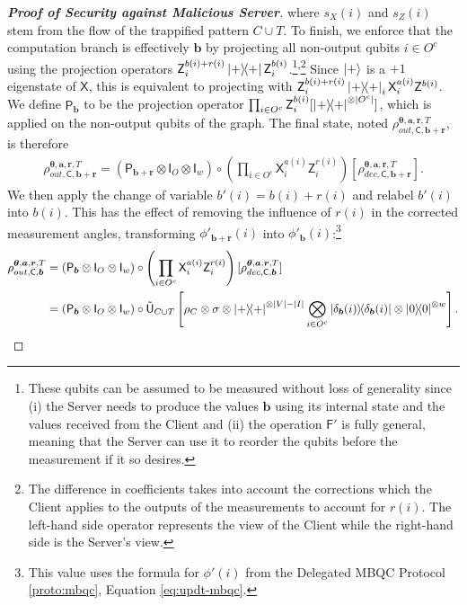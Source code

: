 \documentclass[12pt]{iopart}
\newcommand{\cptp}[1]{\mathsf{#1}} \newcommand{\pd}[1]{\mathcal{#1}}  \newcommand{\sch}[1]{\bm{#1}}
\newcommand{\Id}{\cptp{I}}
\newcommand{\X}{\cptp{X}}
\newcommand{\Z}{\cptp{Z}}
\renewcommand{\1}{\mathds{1}}
\newcommand{\TP}{C\cup T}
\begin{document}
\begin{proof}[\bf Proof of Security against Malicious Server]
where $s_X(i)$ and $s_Z(i)$ stem from the flow of the trappified pattern $\TP$. To finish, we enforce that the computation branch is effectively $\bm{b}$ by projecting all non-output qubits $i \in O^c$ using the projection operators $\Z_i^{b(i) + r(i)}\dyad{+}\Z_i^{b(i)}$.\footnote{These qubits can be assumed to be measured without loss of generality since (i) the Server needs to produce the values $\bm{b}$ using its internal state and the values received from the Client and (ii) the operation $\cptp F'$ is fully general, meaning that the Server can use it to reorder the qubits before the measurement if it so desires.}\textsuperscript{,}\footnote{The difference in coefficients takes into account the corrections which the Client applies to the outputs of the measurements to account for $r(i)$. The left-hand side operator represents the view of the Client while the right-hand side is the Server's view.} Since $\ket{+}$ is a $+1$ eigenstate of $\X$, this is equivalent to projecting with $\Z_i^{b(i) + r(i)}\dyad{+}_i\X_i^{a(i)}\Z^{b(i)}$. We define $\cptp P_{\bm{b}}$ to be the projection operator $\prod_{i \in O^c}\Z^{b(i)}_i[\dyad{+}^{\otimes \abs{O^c}}]$, which is applied on the non-output qubits of the graph. The final state, noted $\rho_{out, \cptp C, \bm{b} + \bm{r}}^{\bm{\theta},\bm{a}, \bm{r}, T}$, is therefore
\begin{align}
\rho_{out, \cptp C, \bm{b} + \bm{r}}^{\bm{\theta},\bm{a}, \bm{r}, T} = (\cptp P_{\bm{b} + \bm{r}}\otimes \Id_O\otimes \Id_w) \circ \left(\prod_{i \in O^c} \X^{a(i)}_i\Z^{r(i)}_i\right)[\rho_{dec, \cptp C, \bm{b} + \bm{r}}^{\bm{\theta},\bm{a}, \bm{r}, T}].
\end{align}
We then apply the change of variable $b'(i) = b(i) + r(i)$ and relabel $b'(i)$ into $b(i)$. This has the effect of removing the influence of $r(i)$ in the corrected measurement angles, transforming $\phi'_{\bm{b} +\bm{r}}(i)$ into $\phi'_{\bm{b}}(i)$:\footnote{This value uses the formula for $\phi'(i)$ from the Delegated MBQC Protocol \ref{proto:mbqc}, Equation \ref{eq:updt-mbqc}.}
\begin{align}
\rho_{out, \cptp C, \bm{b}}^{\bm{\theta},\bm{a}, \bm{r}, T} &= (\cptp P_{\bm{b}}\otimes \Id_O\otimes\Id_w) \circ \left(\prod_{i \in O^c} \X^{a(i)}_i\Z^{r(i)}_i\right)[\rho_{dec, \cptp C, \bm{b}}^{\bm{\theta},\bm{a}, \bm{r}, T}]\\
&= (\cptp P_{\bm{b}}\otimes \Id_O\otimes\Id_w)\circ \tilde{\cptp U}_{\TP} \left[\rho_C \otimes \sigma \otimes \dyad{+}^{\otimes |V| - |I|}\bigotimes_{i \in O^c} \dyad{\delta_{\bm{b}}(i)} \otimes\dyad{0}^{\otimes w}\right].

\end{align}
\end{proof}
\end{document}
